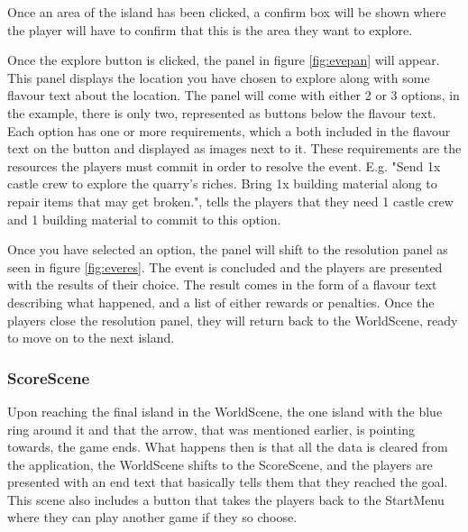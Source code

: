 Once an area of the island has been clicked, a confirm box will be shown where the player will have to confirm that this is the area they want to explore. 

Once the explore button is clicked, the panel in figure \ref{fig:evepan} will appear. 
This panel displays the location you have chosen to explore along with some flavour text about the location. 
The panel will come with either 2 or 3 options, in the example, there is only two, represented as buttons below the flavour text. 
Each option has one or more requirements, which a both included in the flavour text on the button and displayed as images next to it. These requirements are the resources the players must commit in order to resolve the event. 
E.g. "Send 1x castle crew to explore the quarry's riches. Bring 1x building material along to repair items that may get broken.", tells the players that they need 1 castle crew and 1 building material to commit to this option.

Once you have selected an option, the panel will shift to the resolution panel as seen in figure \ref{fig:everes}. The event is concluded and the players are presented with the results of their choice. The result comes in the form of a flavour text describing what happened, and a list of either rewards or penalties.
Once the players close the resolution panel, they will return back to the WorldScene, ready to move on to the next island.

\subsubsection{ScoreScene}
Upon reaching the final island in the WorldScene, the one island with the blue ring around it and that the arrow, that was mentioned earlier, is pointing towards, the game ends. 
What happens then is that all the data is cleared from the application, the WorldScene shifts to the ScoreScene, and the players are presented with an end text that basically tells them that they reached the goal. This scene also includes a button that takes the players back to the StartMenu where they can play another game if they so choose.

